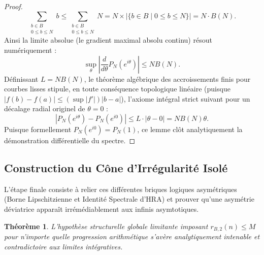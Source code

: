 \documentclass[12pt,a4paper]{article}
\newtheorem{theorem}{Th\'eor\`eme}[section]
\begin{document}
\begin{proof}
\begin{equation}
\sum_{\substack{b \in B \\ 0 \le b \le N}} b \le \sum_{\substack{b \in B \\ 0 \le b \le N}} N = N \times \left| \{b \in B \mid 0 \le b \le N\} \right| = N \cdot B(N).
\end{equation}
Ainsi la limite absolue (le gradient maximal absolu continu) r\'esout num\'eriquement :
\begin{equation}
\sup_{\theta} \left| \frac{d}{d\theta} P_N(e^{i\theta}) \right| \le N B(N).
\end{equation}
D\'efinissant $L = N B(N)$, le th\'eor\`eme alg\'ebrique des accroissements finis pour courbes lisses stipule, en toute cons\'equence topologique lin\'eaire (puisque $|f(b)-f(a)| \le (\sup|f'|)|b-a|$), l'axiome int\'egral strict suivant pour un d\'ecalage radial originel de $\theta=0$ :
\begin{equation}
| P_N(e^{i\theta}) - P_N(e^{i0}) | \le L \cdot |\theta - 0| = N B(N) \theta.
\end{equation}
Puisque formellement $P_N(e^{i0}) = P_N(1)$, ce lemme cl\^ot analytiquement la d\'emonstration diff\'erentielle du spectre.
\end{proof}

\subsection{Construction du C\^one d'Irr\'egularit\'e Isol\'e}

L'\'etape finale consiste \`a relier ces diff\'erentes briques logiques asym\'etriques (Borne Lipschitzienne et Identit\'e Spectrale d'HRA) et prouver qu'une asym\'etrie d\'eviatrice appara\^it irr\'em\'ediablement aux infinis asymtotiques.

\begin{theorem}
L'hypoth\`ese structurelle globale limitante imposant $r_{B,2}(n) \le M$ pour n'importe quelle progression arithm\'etique s'av\`ere analytiquement intenable et contradictoire aux limites int\'egratives.
\end{theorem}
\end{document}
